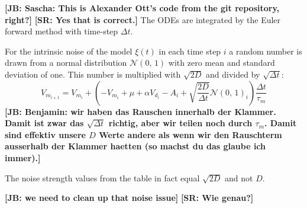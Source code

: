 \documentclass[12pt,a4paper]{article}
\newcommand{\note}[2][]{\textbf{[#1: #2]}}
\begin{document}
\note[JB]{Sascha: This is Alexander Ott's code from the git repository, right?}
\note[SR]{Yes that is correct.}
The ODEs are integrated by the Euler forward method with time-step $\Delta t$.

For the intrinsic noise of the model $\xi(t)$ in each time step $i$ a random number is drawn from a normal distribution $\mathcal{N}(0,\,1)$ with zero mean and standard deviation of one. This number is multiplied with $\sqrt{2D}$ and divided by $\sqrt{\Delta t}$:
\begin{equation}
  \label{LIFintegration}
  V_{m_{i+1}}  = V_{m_i} + \left(-V_{m_i} + \mu + \alpha V_{d_i} - A_i + \sqrt{\frac{2D}{\Delta t}}\mathcal{N}(0,\,1)_i\right) \frac{\Delta t}{\tau_m}
\end{equation}
\note[JB]{Benjamin: wir haben das Rauschen innerhalb der Klammer. Damit ist zwar das $\sqrt{\Delta t}$ richtig, aber wir teilen noch durch $\tau_m$. Damit sind effektiv unsere $D$ Werte andere als wenn wir den Rauschterm ausserhalb der Klammer haetten (so machst du das glaube ich immer).}

The noise strength values from the table in fact equal $\sqrt{2D}$ and not $D$.

\note[JB]{we need to clean up that noise issue}
\note[SR]{Wie genau?}
\end{document}

